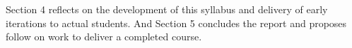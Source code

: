 Section 4 reflects on the development of this syllabus and delivery of early iterations to actual students.
And Section 5 concludes the report and proposes follow on work to deliver a completed course.
